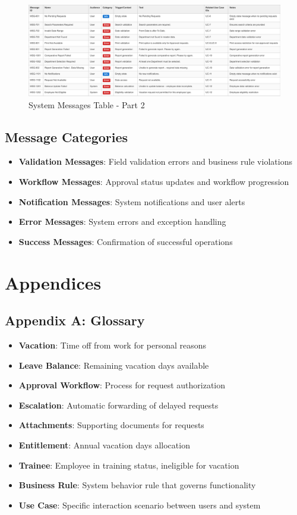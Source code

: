 \documentclass[12pt,a4paper]{article}
\begin{document}
\begin{figure}[H]
\centering
\includegraphics[width=1.0\textwidth]{Use-Cases/Messages-Table/Messages-Table-2.png}
\caption{System Messages Table - Part 2}
\label{fig:messages-table-2}
\end{figure}

\subsection{Message Categories}
\begin{itemize}
    \item \textbf{Validation Messages}: Field validation errors and business rule violations
    \item \textbf{Workflow Messages}: Approval status updates and workflow progression
    \item \textbf{Notification Messages}: System notifications and user alerts
    \item \textbf{Error Messages}: System errors and exception handling
    \item \textbf{Success Messages}: Confirmation of successful operations
\end{itemize}

\section{Appendices}

\subsection{Appendix A: Glossary}
\begin{itemize}
    \item \textbf{Vacation}: Time off from work for personal reasons
    \item \textbf{Leave Balance}: Remaining vacation days available
    \item \textbf{Approval Workflow}: Process for request authorization
    \item \textbf{Escalation}: Automatic forwarding of delayed requests
    \item \textbf{Attachments}: Supporting documents for requests
    \item \textbf{Entitlement}: Annual vacation days allocation
    \item \textbf{Trainee}: Employee in training status, ineligible for vacation
    \item \textbf{Business Rule}: System behavior rule that governs functionality
    \item \textbf{Use Case}: Specific interaction scenario between users and system
\end{itemize}
\end{document}
